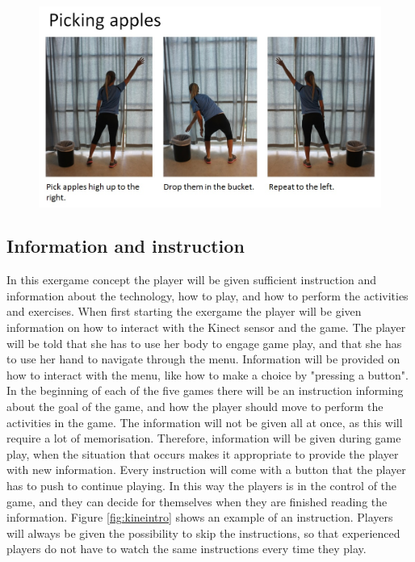 \begin{figure} [H]
\centering
\includegraphics[scale=0.5]{PickingApplesAlone.jpg}
\caption[Exercise - picking apples]{}
\label{pickingapples}
\end{figure}

\subsection{Information and instruction}
In this exergame concept the player will be given sufficient instruction and information about the technology, how to play, and how to perform the activities and exercises. When first starting the exergame the player will be given information on how to interact with the Kinect sensor and the game. The player will be told that she has to use her body to engage game play, and that she has to use her hand to navigate through the menu. Information will be provided on how to interact with the menu, like how to make a choice by "pressing a button". In the beginning of each of the five games there will be an instruction informing about the goal of the game, and how the player should move to perform the activities in the game. The information will not be given all at once, as this will require a lot of memorisation. Therefore, information will be given during game play, when the situation that occurs makes it appropriate to provide the player with new information. Every instruction will come with a button that the player has to push to continue playing. In this way the players is in the control of the game, and they can decide for themselves when they are finished reading the information. Figure \ref{fig:kineintro} shows an example of an instruction. Players will always be given the possibility to skip the instructions, so that experienced players do not have to watch the same instructions every time they play.

